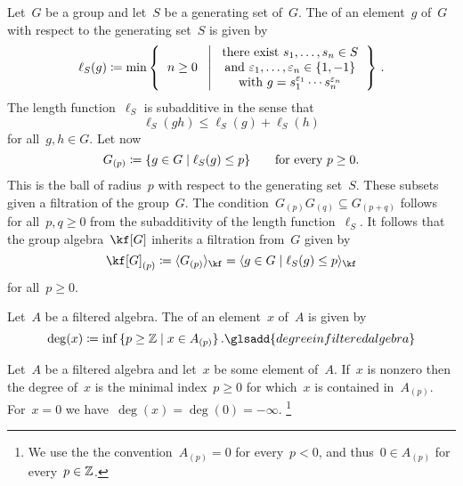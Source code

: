 \begin{examples}
\begin{enumerate}
			Let~$G$ be a group and let~$S$ be a generating set of~$G$.
			The  of an element~$g$ of~$G$ with respect to the generating set~$S$ is given by
			\[
				\ell_S(g)
				\defined
				\min
				\left\{
					\begin{tabular}{c}
						$n \geq 0$
					\end{tabular}
				\suchthat*
					\begin{tabular}{c}
						there exist~$s_1, \dotsc, s_n \in S$ \\
						and~$\varepsilon_1, \dots, \varepsilon_n \in \{1, -1\}$ \\
						with~$g = s_1^{\varepsilon_1} \dotsm s_n^{\varepsilon_n}$
					\end{tabular}
				\right\}  \,.
			\]
			The length function~$\ell_S$ is subadditive in the sense that
			\[
				\ell_S(gh)
				\leq
				\ell_S(g) + \ell_S(h)
			\]
			for all~$g, h \in G$.
			Let now
			\[
				G_{(p)}
				\defined
				\{
					g \in G
				\suchthat
					\ell_S(g) \leq p
				\}
				\qquad
				\text{for every~$p \geq 0$.}
			\]
			This is the ball of radius~$p$ with respect to the generating set~$S$.
			These subsets given a filtration of the group~$G$.
			The condition~$G_{(p)} G_{(q)} \subseteq G_{(p + q)}$ follows for all~$p, q \geq 0$ from the subadditivity of the length function~$\ell_S$.
			It follows that the group algebra~$\kf[G]$ inherits a filtration from~$G$ given by
			\[
				\kf[G]_{(p)}
				\defined
				\gen{ G_{(p)} }_{\kf}
				=
				\gen{
					g \in G
				\suchthat
					\ell_S(g) \leq p
				}_{\kf} 
			\]
			for all~$p \geq 0$.
	\end{enumerate}
\end{examples}


\begin{definition}
	Let~$A$ be a filtered algebra.
	The  of an element~$x$ of~$A$ is given by
	\[
		\deg(x)
		\defined
		\inf
		{}
		\{
			p \geq \Integer
		\suchthat
			x \in A_{(p)}
		\} \,.
		\glsadd{degree in filtered algebra}
	\]
\end{definition}


\begin{remark}
	Let~$A$ be a filtered algebra and let~$x$ be some element of~$A$.
	If~$x$ is nonzero then the degree of~$x$ is the minimal index~$p \geq 0$ for which~$x$ is contained in~$A_{(p)}$.
	For~$x = 0$ we have~$\deg(x) = \deg(0) = -\infty$.%
	\footnote{We use the the convention~$A_{(p)} = 0$ for every~$p < 0$, and thus~$0 \in A_{(p)}$ for every~$p \in \mathbb{Z}$.}
\end{remark}


